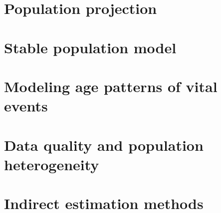 \documentclass[
]{book}
\begin{document}
\hypertarget{population-projection}{%
\chapter{Population projection}\label{population-projection}}

\hypertarget{stable-population-model}{%
\chapter{Stable population model}\label{stable-population-model}}

\hypertarget{modeling-age-patterns-of-vital-events}{%
\chapter{Modeling age patterns of vital events}\label{modeling-age-patterns-of-vital-events}}

\hypertarget{data-quality-and-population-heterogeneity}{%
\chapter{Data quality and population heterogeneity}\label{data-quality-and-population-heterogeneity}}

\hypertarget{indirect-estimation-methods}{%
\chapter{Indirect estimation methods}\label{indirect-estimation-methods}}

  
\end{document}
